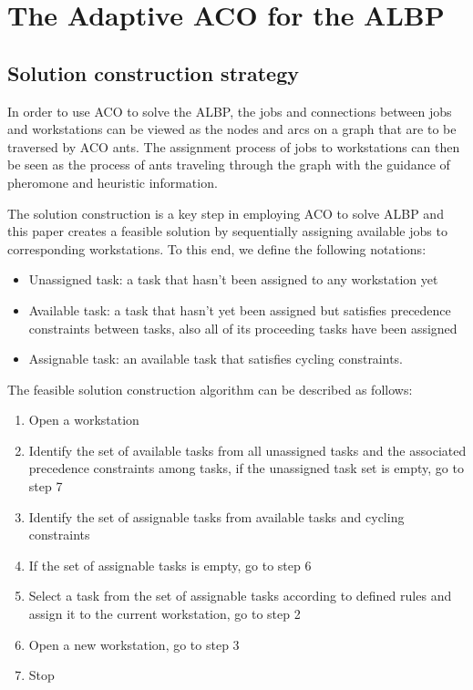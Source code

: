 \section{The Adaptive ACO for the ALBP}
\subsection{Solution construction strategy}
In order to use ACO to solve the ALBP, the jobs and connections between jobs and workstations can be viewed as the nodes and arcs on a graph that are to be traversed by ACO ants.
The assignment process of jobs to workstations can then be seen as the process of ants traveling through the graph with the guidance of pheromone and heuristic information.

The solution construction is a key step in employing ACO to solve ALBP and this paper creates a feasible solution by sequentially assigning available jobs to corresponding workstations.
To this end, we define the following notations:
\begin{itemize}
	\item Unassigned task: a task that hasn't been assigned to any workstation yet
	\item Available task: a task that hasn't yet been assigned but satisfies precedence constraints between tasks, also all of its proceeding tasks have been assigned
	\item Assignable task: an available task that satisfies cycling constraints.
\end{itemize}

The feasible solution construction algorithm can be described as follows:
\begin{enumerate}
	\item Open a workstation
	\item Identify the set of available tasks from all unassigned tasks and the associated precedence constraints among tasks, if the unassigned task set is empty, go to step 7
	\item Identify the set of assignable tasks from available tasks and cycling constraints
	\item If the set of assignable tasks is empty, go to step 6
	\item Select a task from the set of assignable tasks according to defined rules and assign it to the current workstation, go to step 2
	\item Open a new workstation, go to step 3
	\item Stop
\end{enumerate}

